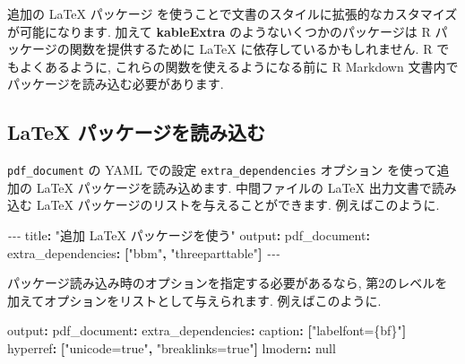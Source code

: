 \documentclass[
  11pt,
]{bxjsreport}
\newenvironment{Shaded}{\begin{snugshade}}{\end{snugshade}}
\newcommand{\AttributeTok}[1]{\textcolor[rgb]{0.77,0.63,0.00}{#1}}
\newcommand{\CharTok}[1]{\textcolor[rgb]{0.31,0.60,0.02}{#1}}
\newcommand{\FunctionTok}[1]{\textcolor[rgb]{0.00,0.00,0.00}{#1}}
\newcommand{\KeywordTok}[1]{\textcolor[rgb]{0.13,0.29,0.53}{\textbf{#1}}}
\newcommand{\PreprocessorTok}[1]{\textcolor[rgb]{0.56,0.35,0.01}{\textit{#1}}}
\newcommand{\StringTok}[1]{\textcolor[rgb]{0.31,0.60,0.02}{#1}}
\begin{document}
追加の LaTeX パッケージ を使うことで文書のスタイルに拡張的なカスタマイズが可能になります. 加えて \textbf{kableExtra} \autocite{R-kableExtra} のようないくつかのパッケージは R パッケージの関数を提供するために LaTeX に依存しているかもしれません. R でもよくあるように, これらの関数を使えるようになる前に R Markdown 文書内でパッケージを読み込む必要があります.

\hypertarget{loading-latex-packages}{%
\subsection{LaTeX パッケージを読み込む}\label{loading-latex-packages}}

\texttt{pdf\_document} の YAML での設定 \texttt{extra\_dependencies} オプション を使って追加の LaTeX パッケージを読み込めます. 中間ファイルの LaTeX 出力文書で読み込む LaTeX パッケージのリストを与えることができます. 例えばこのように.

\begin{Shaded}
\begin{Highlighting}[]
\PreprocessorTok{{-}{-}{-}}
\FunctionTok{title}\KeywordTok{:}\AttributeTok{ }\StringTok{"追加 LaTeX パッケージを使う"}
\FunctionTok{output}\KeywordTok{:}\AttributeTok{ }
\AttributeTok{  }\FunctionTok{pdf\_document}\KeywordTok{:}
\AttributeTok{    }\FunctionTok{extra\_dependencies}\KeywordTok{:}\AttributeTok{ }\KeywordTok{[}\StringTok{"bbm"}\KeywordTok{,}\AttributeTok{ }\StringTok{"threeparttable"}\KeywordTok{]}
\PreprocessorTok{{-}{-}{-}}
\end{Highlighting}
\end{Shaded}

パッケージ読み込み時のオプションを指定する必要があるなら, 第2のレベルを加えてオプションをリストとして与えられます. 例えばこのように.

\begin{Shaded}
\begin{Highlighting}[]
\FunctionTok{output}\KeywordTok{:}\AttributeTok{ }
\AttributeTok{  }\FunctionTok{pdf\_document}\KeywordTok{:}
\AttributeTok{    }\FunctionTok{extra\_dependencies}\KeywordTok{:}
\AttributeTok{      }\FunctionTok{caption}\KeywordTok{:}\AttributeTok{ }\KeywordTok{[}\StringTok{"labelfont=\{bf\}"}\KeywordTok{]}
\AttributeTok{      }\FunctionTok{hyperref}\KeywordTok{:}\AttributeTok{ }\KeywordTok{[}\StringTok{"unicode=true"}\KeywordTok{,}\AttributeTok{ }\StringTok{"breaklinks=true"}\KeywordTok{]}
\AttributeTok{      }\FunctionTok{lmodern}\KeywordTok{:}\AttributeTok{ }\CharTok{null}
\end{Highlighting}
\end{Shaded}
\end{document}
